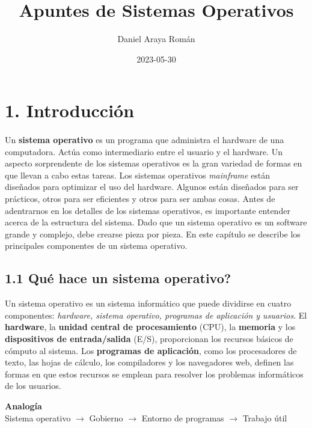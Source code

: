 \documentclass{article}
\title{Apuntes de Sistemas Operativos}
\date{2023-05-30}
\author{Daniel Araya Rom\'{a}n}
\begin{document}
\maketitle
\newpage

\section*{1. Introducci\'{o}n}
\paragraph*{}
\normalsize

Un \textbf{sistema operativo} es un programa que administra el hardware de una computadora.
Act\'{u}a como intermediario entre el usuario y el hardware. Un aspecto sorprendente de los 
sistemas operativos es la gran variedad de formas en que llevan a cabo estas tareas. Los 
sistemas operativos \textit{mainframe} est\'{a}n dise\~{n}ados para optimizar el uso del hardware.
Algunos est\'{a}n dise\~{n}ados para ser pr\'{a}cticos, otros para ser eficientes y otros para ser
ambas cosas. Antes de adentrarnos en los detalles de los sistemas operativos, es importante
entender acerca de la estructura del sistema. Dado que un sistema operativo es un software grande
y complejo, debe crearse pieza por pieza. En este cap\'{i}tulo se describe los principales componentes
de un sistema operativo.

\subsection*{1.1 Qu\'{e} hace un sistema operativo?}
Un sistema operativo es un sistema inform\'{a}tico que puede dividirse en cuatro componentes:
\textit{hardware, sistema operativo, programas de aplicaci\'{o}n y usuarios}.
El \textbf{hardware}, la \textbf{unidad central de procesamiento} (CPU), la \textbf{memoria} y los
\textbf{dispositivos de entrada/salida} (E/S), proporcionan los recursos b\'{a}sicos de c\'{o}mputo
al sistema. Los \textbf{programas de aplicaci\'{o}n}, como los procesadores de texto, las hojas de
c\'{a}lculo, los compiladores y los navegadores web, definen las formas en que estos recursos se
emplean para resolver los problemas inform\'{a}ticos de los usuarios. 

\begin{center}
    \textbf{Analog\'{i}a} \\
    Sistema operativo $\rightarrow$ Gobierno $\rightarrow$ Entorno de programas $\rightarrow$ 
    Trabajo \'{u}til 
\end{center}
\end{document}
